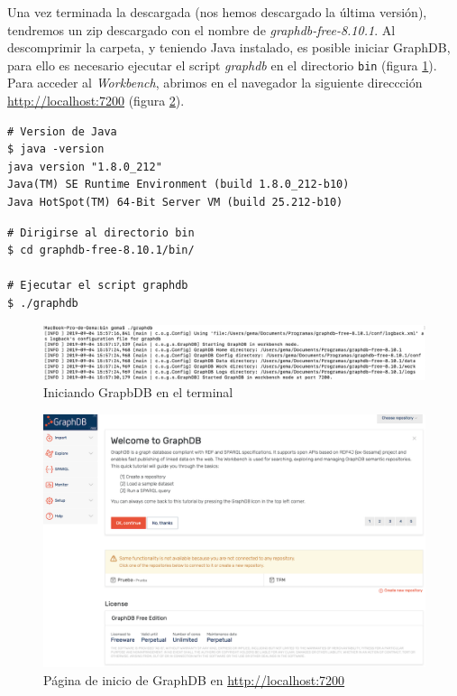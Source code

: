 Una vez terminada la descargada (nos hemos descargado la última versión), tendremos un zip descargado con el nombre de \textit{graphdb-free-8.10.1}. Al descomprimir la carpeta, y teniendo Java instalado, es posible iniciar GraphDB, para ello es necesario ejecutar el script \textit{graphdb} en el directorio \texttt{bin} (figura \ref{fig:4}). Para acceder al \textit{Workbench}, abrimos en el navegador la siguiente direccción \url{http://localhost:7200} (figura \ref{fig:5}).\\

\begin{lstlisting}
# Version de Java
$ java -version
java version "1.8.0_212"
Java(TM) SE Runtime Environment (build 1.8.0_212-b10)
Java HotSpot(TM) 64-Bit Server VM (build 25.212-b10)
\end{lstlisting}

\begin{lstlisting}
# Dirigirse al directorio bin
$ cd graphdb-free-8.10.1/bin/

# Ejecutar el script graphdb 
$ ./graphdb
\end{lstlisting}

\begin{figure}[H]
	\centering
	\includegraphics[width=1\linewidth]{imagenes/apendices/4}
	\caption{Iniciando GrapbDB en el terminal}
	\label{fig:4}
\end{figure}


\begin{figure}[H]
	\centering
	\includegraphics[width=1\linewidth]{imagenes/apendices/5}
	\caption{Página de inicio de GraphDB en \url{http://localhost:7200}}
	\label{fig:5}
\end{figure}

